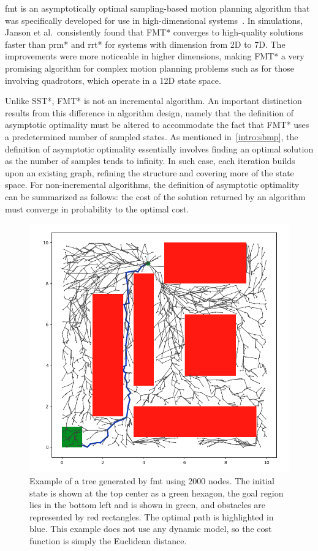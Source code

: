 \gls{fmt} is an asymptotically optimal sampling-based motion planning algorithm that was specifically developed for use in high-dimensional systems~\cite{Janson2015}. In simulations, Janson et al.\ consistently found that FMT* converges to high-quality solutions faster than \gls{prm}* and \gls{rrt}* for systems with dimension from 2D to 7D. The improvements were more noticeable in higher dimensions, making FMT* a very promising algorithm for complex motion planning problems such as for those involving quadrotors, which operate in a 12D state space.

Unlike SST*, FMT* is not an incremental algorithm. An important distinction results from this difference in algorithm design, namely that the definition of asymptotic optimality must be altered to accommodate the fact that FMT* uses a predetermined number of sampled states. As mentioned in~\ref{intro:sbmp}, the definition of asymptotic optimality essentially involves finding an optimal solution as the number of samples tends to infinity. In such case, each iteration builds upon an existing graph, refining the structure and covering more of the state space. For non-incremental algorithms, the definition of asymptotic optimality can be summarized as follows: the cost of the solution returned by an algorithm must converge in probability to the optimal cost.

\begin{figure}
    \centering
    \includegraphics[scale=0.56]{./figures/fmt-2000-nodes}
    \caption[FMT* Example]{Example of a tree generated by \gls{fmt} using 2000 nodes. The initial state is shown at the top center as a green hexagon, the goal region lies in the bottom left and is shown in green, and obstacles are represented by red rectangles. The optimal path is highlighted in blue. This example does not use any dynamic model, so the cost function is simply the Euclidean distance.}
\label{fig:fmt_example}
\end{figure}

